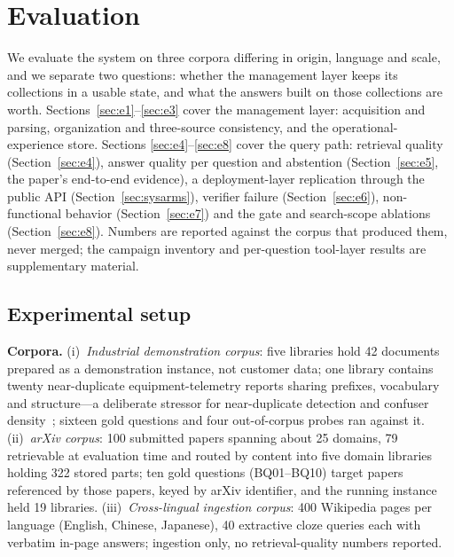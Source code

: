 \section{Evaluation}
\label{sec:eval}

We evaluate the system on three corpora differing in origin, language
and scale, and we separate two questions: whether the management layer keeps
its collections in a usable state, and what the answers built on those
collections are worth. Sections~\ref{sec:e1}--\ref{sec:e3} cover the
management layer: acquisition and parsing, organization and three-source
consistency, and the operational-experience store. Sections
\ref{sec:e4}--\ref{sec:e8} cover the query path: retrieval quality
(Section~\ref{sec:e4}), answer quality per question and abstention
(Section~\ref{sec:e5}, the paper's end-to-end evidence), a deployment-layer
replication through the public API (Section~\ref{sec:sysarms}), verifier
failure (Section~\ref{sec:e6}), non-functional behavior (Section~\ref{sec:e7})
and the gate and search-scope ablations (Section~\ref{sec:e8}). Numbers are
reported against the corpus that produced them, never merged; the campaign
inventory and per-question tool-layer results are supplementary material.

\subsection{Experimental setup}
\label{sec:eval-setup}

\textbf{Corpora.} (i)~\emph{Industrial demonstration corpus}: five libraries
hold 42 documents prepared as a demonstration instance, not customer data; one
library contains twenty near-duplicate
equipment-telemetry reports sharing prefixes, vocabulary and structure---a
deliberate stressor for near-duplicate detection and confuser
density~\cite{manku-near-dup-2007}; sixteen gold questions and four
out-of-corpus probes ran against it. (ii)~\emph{arXiv corpus}: 100 submitted
papers spanning about 25 domains, 79 retrievable at evaluation time and routed
by content into five domain libraries holding 322 stored parts; ten gold
questions (BQ01--BQ10) target papers referenced by those papers, keyed by arXiv
identifier, and the running instance held 19 libraries. (iii)~\emph{Cross-lingual
ingestion corpus}: 400 Wikipedia pages per language (English, Chinese,
Japanese), 40 extractive cloze queries each with verbatim in-page answers;
ingestion only, no retrieval-quality numbers reported.


